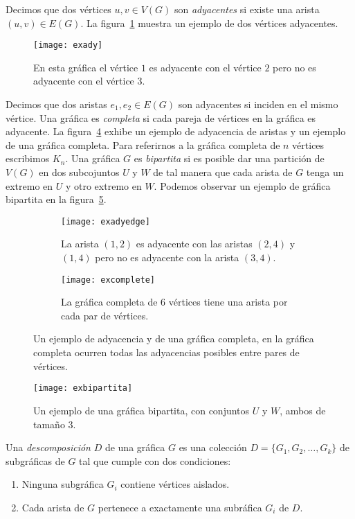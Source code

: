 Decimos que dos vértices $u,v\in V(G)$ son \emph{adyacentes} si existe una arista
$(u,v)\in E(G)$. La figura~\ref{fig:exady} muestra un ejemplo de dos vértices adyacentes.
\begin{figure}[htb]
  \centering
  \texttt{[image: exady]}
  \caption{En esta gráfica el vértice $1$ es adyacente con el vértice $2$ pero
  no es adyacente con el vértice $3$.}
  \label{fig:exady}
\end{figure}
Decimos que dos aristas $e_1,e_2 \in E(G)$ son adyacentes
si inciden en el mismo vértice. Una gráfica es \emph{completa} si cada pareja de vértices
en la gráfica es adyacente. La figura~\ref{fig:exadycomplete} exhibe un ejemplo de adyacencia de
aristas y un ejemplo de una gráfica completa. Para referirnos a la gráfica completa de $n$
vértices escribimos $K_n$. Una gráfica $G$ es \emph{bipartita} si es posible
dar una partición de $V(G)$ en dos subcojuntos $U$ y $W$ de tal manera que cada
arista de $G$ tenga un extremo en $U$ y otro extremo en $W$. Podemos observar
un ejemplo de gráfica bipartita en la figura~\ref{fig:exbipar}.
\begin{figure}[htb]
  \centering
\begin{subfigure}[h]{.4\textwidth}
  \centering
  \texttt{[image: exadyedge]}
  \caption{La arista $(1,2)$ es adyacente con las aristas $(2,4)$ y $(1,4)$ pero
  no es adyacente con la arista $(3,4)$.}
  \label{fig:exadyedge}
\end{subfigure}\hfill%
\begin{subfigure}[h]{.4\textwidth}
  \centering
  \texttt{[image: excomplete]}
  \caption{La gráfica completa de 6 vértices tiene una arista por cada par de vértices.}
  \label{fig:excomplete}
\end{subfigure}
\caption{Un ejemplo de adyacencia y de una gráfica completa, en la gráfica completa
ocurren todas las adyacencias posibles entre pares de vértices.}
\label{fig:exadycomplete}
\end{figure}
\begin{figure}[h]
  \centering
  \texttt{[image: exbipartita]}
  \caption{Un ejemplo de una gráfica bipartita, con conjuntos $U$ y $W$, ambos de tamaño 3.}
  \label{fig:exbipar}
\end{figure}

Una \emph{descomposición} $D$ de una gráfica $G$ es una colección $D=\{G_1,G_2,\dots,G_k\}$ de
subgráficas de $G$ tal que cumple con dos condiciones:
\begin{enumerate}
  \item Ninguna subgráfica $G_i$ contiene vértices aislados.
  \item Cada arista de $G$ pertenece a exactamente una subráfica $G_i$ de $D$.
\end{enumerate}

